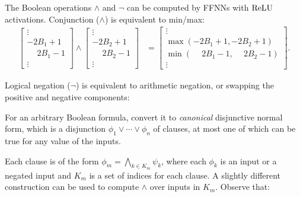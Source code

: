     
    The Boolean operations $\land$ and $\lnot$ can be computed by FFNNs with $\text{ReLU}$ activations. Conjunction ($\land$) is equivalent to min/max:
  \begin{align*}
  \begin{bmatrix} \vdots \\ -2B_1+1 \\ \phantom{-}2B_1-1 \\ \vdots \end{bmatrix} \land \begin{bmatrix} \vdots \\ -2B_2+1 \\ \phantom{-}2B_2-1 \\ \vdots \end{bmatrix} &= \begin{bmatrix} \vdots \\ \max(-2B_1+1,-2B_2+1) \\ \min(\phantom{-}2B_1-1,\phantom{-}2B_2-1) \\ \vdots \end{bmatrix}.
  \end{align*}

  Logical negation ($\lnot$) is equivalent to arithmetic negation, or swapping the positive and negative components:
  \begin{center}
  \end{center}

    For an arbitrary Boolean formula, convert it to \emph{canonical} disjunctive normal form, which is a disjunction $\phi_1 \lor \cdots \lor \phi_n$ of clauses, at most one of which can be true for any value of the inputs.
    
    Each clause is of the form $\phi_m = \bigwedge_{k\in K_m} \psi_k$, where each $\phi_k$ is an input or a negated input and $K_m$ is a set of indices for each clause. A slightly different construction can be used to compute $\land$ over inputs in $K_m$. Observe that:

